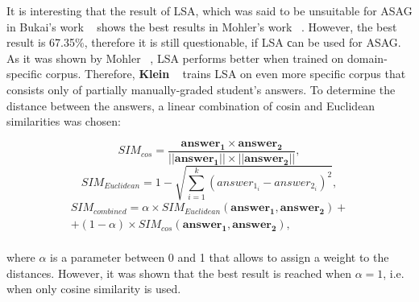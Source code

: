 \documentclass[11pt]{report}
\numberwithin{equation}{section} %
\begin{document}
It is interesting that the result of LSA, which was said to be unsuitable for ASAG in Bukai's work ~\cite{SAMText} shows the best results in Mohler's work ~\cite{Mohler}. However, the best result is 67.35\%, therefore it is still questionable, if LSA сan be used for ASAG. \\

As it was shown by Mohler ~\cite{Mohler}, LSA performs better when trained on domain-specific corpus. Therefore, \textbf{Klein} ~\cite{Klein} trains LSA on even more specific corpus that consists only of partially manually-graded student's answers. To determine the distance between the answers, a linear combination of cosin and Euclidean similarities was chosen:

\begin{equation} \label{eq:cos}
SIM_{cos} = \frac{\pmb{answer_1} \times \pmb{answer_2}}{||\pmb{answer_1}|| \times ||\pmb{answer_2}||},
\end{equation}
\begin{equation} \label{eq:Euclidean}
SIM_{Euclidean} = 1 - \sqrt{\sum^k_{i=1}(answer_{1_i} - answer_{2_i})^2},
\end{equation}
\begin{equation} \label{eq:combinedCE}
\begin{array}{l}
SIM_{combined} = \alpha  \times SIM_{Euclidean}(\pmb{answer_1}, \pmb{answer_2}) + \\ + (1-\alpha) \times SIM_{cos}(\pmb{answer_1}, \pmb{answer_2}),
\end{array}
\end{equation}\\
 where $\alpha$ is a parameter between 0 and 1 that allows to assign a weight to the distances. However, it was shown that the best result is reached when $\alpha = 1$, i.e. when only cosine similarity is used. \\
  
\end{document}
